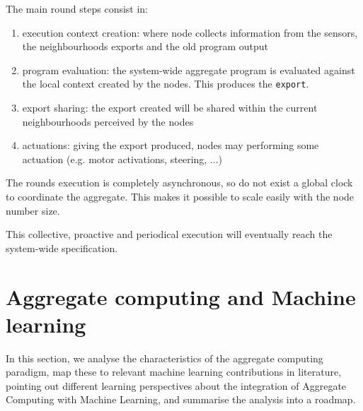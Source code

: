 \documentclass[conference]{IEEEtran}
\newcommand{\export}{\texttt{export}}
\begin{document}
The main round steps consist in:
\begin{enumerate}
  \item execution context creation: where node collects information from the sensors, the neighbourhoods exports and the old
  program output
  \item program evaluation: the system-wide aggregate program is evaluated against the local context created by the nodes. 
  This produces the \export{}.
  \item export sharing: the export created will be shared within the current neighbourhoods perceived by the nodes
  \item actuations: giving the export produced, nodes may performing some actuation (e.g. motor activations, steering, ...)
\end{enumerate}

The rounds execution is completely asynchronous, so do not exist a global clock to coordinate the aggregate. 
 This makes it possible to scale easily with the node number size.

This collective, proactive and periodical execution will eventually reach the system-wide specification.

\section{Aggregate computing and Machine learning}

In this section,
 we analyse the characteristics of the aggregate computing paradigm,
 map these to relevant machine learning contributions in literature,
 pointing out different learning perspectives about the integration of Aggregate Computing with Machine Learning,
 and summarise the analysis into a roadmap.
\end{document}

